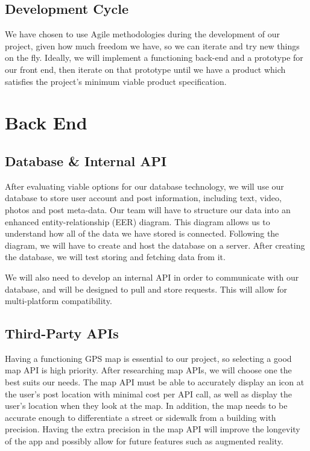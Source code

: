 \documentclass[draftclsnofoot, onecolumn,journal,letterpaper,10pt, compsoc]{IEEEtran}
\begin{document}
\subsection{Development Cycle}
We have chosen to use Agile methodologies during the development of our project, given how much freedom we have, so we can iterate and try new things on the fly. Ideally, we will implement a functioning back-end and a prototype for our front end, then iterate on that prototype until we have a product which satisfies the project's minimum viable product specification.

\section{Back End}

\subsection{Database \& Internal API}
After evaluating viable options for our database technology, we will use our database to store user account and post information, including text, video, photos and post meta-data. Our team will have to structure our data into an enhanced entity-relationship (EER) diagram. This diagram allows us to understand how all of the data we have stored is connected. Following the diagram, we will have to create and host the database on a server. After creating the database, we will test storing and fetching data from it.

We will also need to develop an internal API in order to communicate with our database, and will be designed to pull and store requests. This will allow for multi-platform compatibility. 

\subsection{Third-Party APIs}
Having a functioning GPS map is essential to our project, so selecting a good map API is high priority. After researching map APIs, we will choose one the best suits our needs. The map API must be able to accurately display an icon at the user's post location with minimal cost per API call, as well as display the user's location when they look at the map. In addition, the map needs to be accurate enough to differentiate a street or sidewalk from a building with precision.  Having the extra precision in the map API will improve the longevity of the app and possibly allow for future features such as augmented reality.
\end{document}
